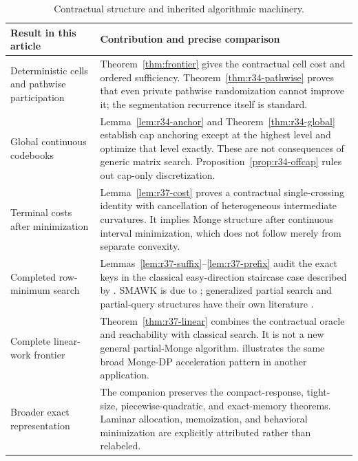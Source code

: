 \begin{table}[p]
\caption{Contractual structure and inherited algorithmic machinery.}\label{tab:r37-priority}
\begin{tabular}{p{}p{}}
\toprule
Result in this article & Contribution and precise comparison \\
\midrule
Deterministic cells and pathwise participation & Theorem~\ref{thm:frontier} gives the contractual cell cost and ordered sufficiency. Theorem~\ref{thm:r34-pathwise} proves that even private pathwise randomization cannot improve it; the segmentation recurrence itself is standard. \\
Global continuous codebooks & Lemma~\ref{lem:r34-anchor} and Theorem~\ref{thm:r34-global} establish cap anchoring except at the highest level and optimize that level exactly. These are not consequences of generic matrix search. Proposition~\ref{prop:r34-offcap} rules out cap-only discretization. \\
Terminal costs after minimization & Lemma~\ref{lem:r37-cost} proves a contractual single-crossing identity with cancellation of heterogeneous intermediate curvatures. It implies Monge structure after continuous interval minimization, which does not follow merely from separate convexity. \\
Completed row-minimum search & Lemmas~\ref{lem:r37-suffix}--\ref{lem:r37-prefix} audit the exact keys in the classical easy-direction staircase case described by \citet{Chan2021}. SMAWK is due to \citet{AggarwalEtAl1987}; generalized partial search and partial-query structures have their own literature \citep{KlaweKleitman1990,Kaplan2017}. \\
Complete linear-work frontier & Theorem~\ref{thm:r37-linear} combines the contractual oracle and reachability with classical search. It is not a new general partial-Monge algorithm. \citet{Emmerich2026} illustrates the same broad Monge-DP acceleration pattern in another application. \\
Broader exact representation & The companion preserves the compact-response, tight-size, piecewise-quadratic, and exact-memory theorems. Laminar allocation, memoization, and behavioral minimization are explicitly attributed rather than relabeled. \\
\bottomrule
\end{tabular}
\end{table}

